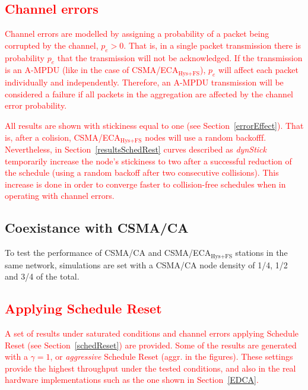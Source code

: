 	\textcolor{red}{\subsection{Channel errors}\label{channelErrorsDef}
	Channel errors are modelled by assigning a probability of a packet being corrupted by the channel, $p_e>0$. That is, in a single packet transmission there is probability $p_e$ that the transmission will not be acknowledged. If the transmission is an A-MPDU (like in the case of CSMA/ECA$_{\text{Hys+FS}}$), $p_e$ will affect each packet individually and independently. Therefore, an A-MPDU transmission will be considered a failure if all packets in the aggregation are affected by the channel error probability.}
	
	\textcolor{red}{All results are shown with stickiness equal to one (see Section~\ref{errorEffect}). That is, after a colision, CSMA/ECA$_{\text{Hys+FS}}$ nodes will use a random backofff. Nevertheless, in Section~\ref{resultsSchedRest} curves described as \emph{dynStick} temporarily increase the node's stickiness to two after a successful reduction of the schedule (using a random backoff after two consecutive collisions). This increase is done in order to converge faster to collision-free schedules when in operating with channel errors.}
	
	\subsection{Coexistance with CSMA/CA}\label{coexistence}
	To test the performance of CSMA/CA and CSMA/ECA$_{\text{Hys+FS}}$ stations in the same network, simulations are set with a CSMA/CA node density of 1/4, 1/2 and 3/4 of the total.
	
	\textcolor{red}{\subsection{Applying Schedule Reset} 
	A set of results under saturated conditions and channel errors applying Schedule Reset (see Section~\ref{schedReset}) are provided. Some of the results are generated with a $\gamma=1$, or \emph{aggressive} Schedule Reset (aggr. in the figures). These settings provide the highest throughput under the tested conditions, and also in the real hardware implementations such as the one shown in Section~\ref{EDCA}.
	}
